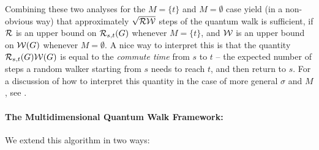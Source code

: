 \documentclass{theoretics}
\renewcommand{\>}{\rangle}
\newcommand{\<}{\langle}
\renewcommand{\(}{\left(}
\renewcommand{\)}{\right)}
\begin{document}
Combining these two analyses for the $M=\{t\}$ and $M=\emptyset$ case yield (in a non-obvious way) that approximately $\sqrt{\cal RW}$ steps of the quantum walk is sufficient, if ${\cal R}$ is an upper bound on ${\cal R}_{s,t}(G)$ whenever $M=\{t\}$, and ${\cal W}$ is an upper bound on ${\cal W}(G)$ whenever $M=\emptyset$. A nice way to  interpret this is that the quantity ${\cal R}_{s,t}(G){\cal W}(G)$ is equal to the \emph{commute time} from $s$ to $t$ -- the expected number of steps a random walker starting from $s$ needs to reach $t$, and then return to $s$. For a discussion of how to interpret this quantity in the case of more general $\sigma$ and $M$, see \cite{apers2019UnifiedFrameworkQWSearch}. 

\paragraph{The Multidimensional Quantum Walk Framework:} We extend this algorithm in two ways:
\end{document}
